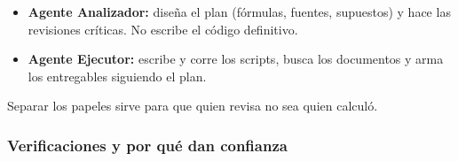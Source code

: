 \documentclass[11pt,letterpaper]{article}
\begin{document}
\begin{itemize}
\item \textbf{Agente Analizador:} diseña el plan (fórmulas, fuentes, supuestos) y hace las revisiones críticas. No escribe el código definitivo.
\item \textbf{Agente Ejecutor:} escribe y corre los scripts, busca los documentos y arma los entregables siguiendo el plan.
\end{itemize}

Separar los papeles sirve para que quien revisa no sea quien calculó.

\subsubsection*{Verificaciones y por qué dan confianza}
\end{document}
